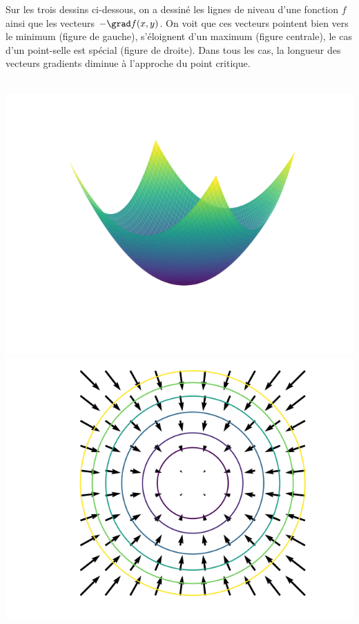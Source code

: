\documentclass[11pt,class=report,crop=false]{standalone}
\begin{document}
Sur les trois dessins ci-dessous, on a dessiné les lignes de niveau d'une fonction $f$ ainsi que les vecteurs $-\grad f(x,y)$. On voit que ces vecteurs pointent bien vers le minimum (figure de gauche), s'éloignent d'un maximum (figure centrale), le cas d'un point-selle est spécial (figure de droite). Dans tous les cas, la longueur des vecteurs gradients diminue à l'approche du point critique.


\begin{center}
\begin{minipage}{0.30\textwidth}
\center
\ \ \includegraphics[scale=\myscale,scale=0.35]{figures/gradient-surface-1b}\\

\includegraphics[scale=\myscale,scale=0.35]{figures/gradient-surface-5a}


\end{minipage}
\end{center}
\end{document}

